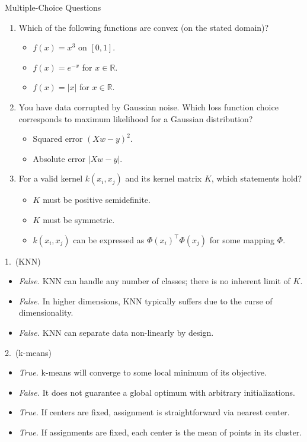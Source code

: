 \documentclass{article}
\begin{document}
\begin{exercise}{Multiple-Choice Questions}
\begin{enumerate}
    \item Which of the following functions are convex (on the stated domain)?
      \begin{itemize}
        \item $f(x) = x^3$ on $[0,1]$.
        \item $f(x) = e^{-x}$ for $x \in \mathbb{R}$.
        \item $f(x) = |x|$ for $x \in \mathbb{R}$.
      \end{itemize}

    \item You have data corrupted by Gaussian noise. Which loss function choice corresponds to maximum likelihood for a Gaussian distribution?
      \begin{itemize}
        \item Squared error $(Xw - y)^2$.
        \item Absolute error $|Xw - y|$.
      \end{itemize}

    \item For a valid kernel $k(x_i, x_j)$ and its kernel matrix $K$, which statements hold?
      \begin{itemize}
        \item $K$ must be positive semidefinite.
        \item $K$ must be symmetric.
        \item $k(x_i, x_j)$ can be expressed as $\Phi(x_i)^\top \Phi(x_j)$ for some mapping $\Phi$.
      \end{itemize}
  \end{enumerate}

  \begin{solution}
    1.\ (KNN)
    \begin{itemize}
      \item \emph{False.} KNN can handle any number of classes; there is no inherent limit of $K$.
      \item \emph{False.} In higher dimensions, KNN typically suffers due to the curse of dimensionality.
      \item \emph{False.} KNN can separate data non-linearly by design.
    \end{itemize}

    2.\ (k-means)
    \begin{itemize}
      \item \emph{True.} k-means will converge to some local minimum of its objective.
      \item \emph{False.} It does not guarantee a global optimum with arbitrary initializations.
      \item \emph{True.} If centers are fixed, assignment is straightforward via nearest center.
      \item \emph{True.} If assignments are fixed, each center is the mean of points in its cluster.
    \end{itemize}


\end{solution}
\end{exercise}
\end{document}
